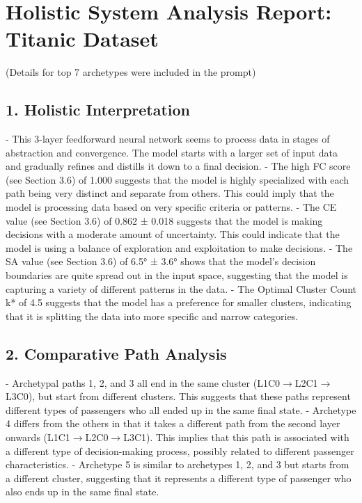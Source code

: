 \section*{Holistic System Analysis Report: Titanic Dataset}
(Details for top 7 archetypes were included in the prompt)

\subsection*{1. Holistic Interpretation}
- This 3-layer feedforward neural network seems to process data in stages of abstraction and convergence. The model starts with a larger set of input data and gradually refines and distills it down to a final decision.
- The high FC score (see Section 3.6) of 1.000 suggests that the model is highly specialized with each path being very distinct and separate from others. This could imply that the model is processing data based on very specific criteria or patterns.
- The CE value (see Section 3.6) of 0.862 ± 0.018 suggests that the model is making decisions with a moderate amount of uncertainty. This could indicate that the model is using a balance of exploration and exploitation to make decisions.
- The SA value (see Section 3.6) of 6.5° ± 3.6° shows that the model's decision boundaries are quite spread out in the input space, suggesting that the model is capturing a variety of different patterns in the data.
- The Optimal Cluster Count k* of 4.5 suggests that the model has a preference for smaller clusters, indicating that it is splitting the data into more specific and narrow categories.

\subsection*{2. Comparative Path Analysis}
- Archetypal paths 1, 2, and 3 all end in the same cluster (L1C0$\rightarrow$L2C1$\rightarrow$L3C0), but start from different clusters. This suggests that these paths represent different types of passengers who all ended up in the same final state.
- Archetype 4 differs from the others in that it takes a different path from the second layer onwards (L1C1$\rightarrow$L2C0$\rightarrow$L3C1). This implies that this path is associated with a different type of decision-making process, possibly related to different passenger characteristics.
- Archetype 5 is similar to archetypes 1, 2, and 3 but starts from a different cluster, suggesting that it represents a different type of passenger who also ends up in the same final state.

